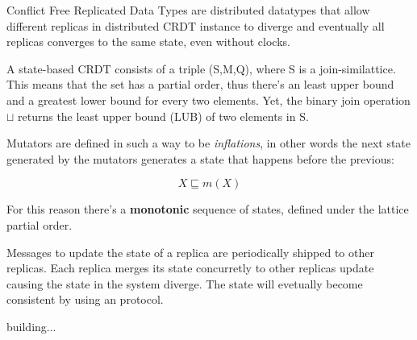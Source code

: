 Conflict Free Replicated Data Types are distributed datatypes that allow different replicas in distributed CRDT instance to diverge and eventually all replicas converges to the same state, even without clocks. 

A state-based CRDT consists of a triple (S,M,Q), where S is a join-similattice. This means that the set has a partial order, thus there's an least upper bound and a greatest lower bound for every two elements. Yet, the binary join operation $\sqcup$ returns the least upper bound (LUB) of two elements in S. 

Mutators are defined in such a way to be \textit{inflations}, in other words the next state generated by the mutators generates a state that happens before the previous:

$$ X \sqsubseteq m(X)$$  

For this reason there's a \textbf{monotonic} sequence of states, defined under the lattice partial order. 

Messages to update the state of a replica are periodically shipped to other replicas. Each replica merges its state concurretly to other replicas update causing the state in the system diverge. The state will evetually become consistent by using an  protocol. 


building...
